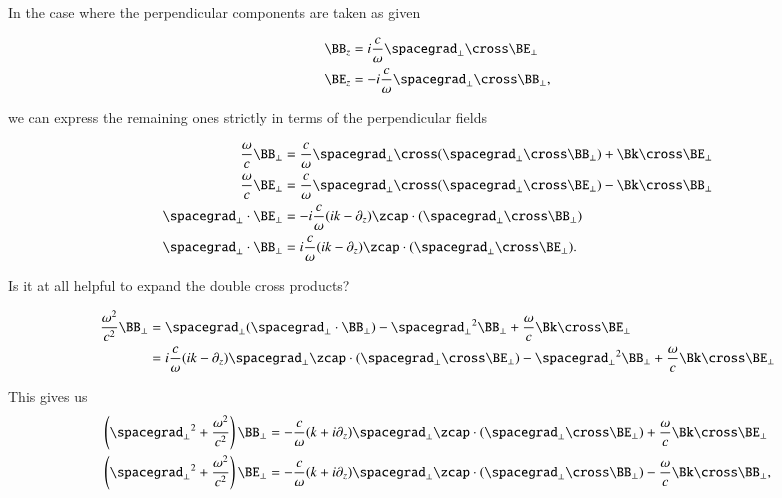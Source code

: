 In the case where the perpendicular components are taken as given

\begin{align}\label{eqn:relativisticElectrodynamicsT4:300}
\BB_z &= i \frac{ c  }{\omega} \spacegrad_\perp \cross \BE_\perp \\
\BE_z &= -i \frac{ c  }{\omega} \spacegrad_\perp \cross \BB_\perp,
\end{align}

we can express the remaining ones strictly in terms of the perpendicular fields

\begin{align}\label{eqn:relativisticElectrodynamicsT4:320}
\frac{\omega}{c} \BB_\perp &= \frac{c}{\omega} \spacegrad_\perp \cross (\spacegrad_\perp \cross \BB_\perp) + \Bk \cross \BE_\perp \\
\frac{\omega}{c} \BE_\perp &= \frac{c}{\omega} \spacegrad_\perp \cross (\spacegrad_\perp \cross \BE_\perp) - \Bk \cross \BB_\perp \\
\spacegrad_\perp \cdot \BE_\perp &= -i \frac{c}{\omega} (i k - \partial_z) \zcap \cdot (\spacegrad_\perp \cross \BB_\perp) \\
\spacegrad_\perp \cdot \BB_\perp &= i \frac{c}{\omega} (i k - \partial_z) \zcap \cdot (\spacegrad_\perp \cross \BE_\perp).
\end{align}

Is it at all helpful to expand the double cross products?

\begin{align*}
\frac{\omega^2}{c^2} \BB_\perp 
&= 
\spacegrad_\perp (\spacegrad_\perp \cdot \BB_\perp) -{\spacegrad_\perp}^2 \BB_\perp + \frac{\omega}{c} \Bk \cross \BE_\perp \\
&= 
i \frac{c}{\omega}
(i k - \partial_z)
\spacegrad_\perp \zcap \cdot (\spacegrad_\perp \cross \BE_\perp)
-{\spacegrad_\perp}^2 \BB_\perp + \frac{\omega}{c} \Bk \cross \BE_\perp 
\end{align*}

This gives us
\begin{align}\label{eqn:relativisticElectrodynamicsT4:340}
\left( {\spacegrad_\perp}^2 + \frac{\omega^2}{c^2} \right) \BB_\perp 
&= - \frac{c}{\omega} (k + i\partial_z) \spacegrad_\perp \zcap \cdot (\spacegrad_\perp \cross \BE_\perp) + \frac{\omega}{c} \Bk \cross \BE_\perp \\
\left( {\spacegrad_\perp}^2 + \frac{\omega^2}{c^2} \right) \BE_\perp 
&= -\frac{c}{\omega} (k + i\partial_z) \spacegrad_\perp \zcap \cdot (\spacegrad_\perp \cross \BB_\perp) - \frac{\omega}{c} \Bk \cross \BB_\perp,
\end{align}

